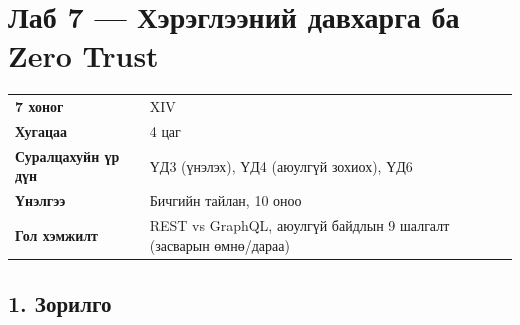 \chapter{Лаб 7 — Хэрэглээний давхарга ба Zero Trust}

\begingroup\scriptsize\begin{longtable}[]{@{}ll@{}}
\toprule
\endhead
\begin{minipage}[t]{0.47\columnwidth}\raggedright
\textbf{7 хоног}\strut
\end{minipage} & \begin{minipage}[t]{0.47\columnwidth}\raggedright
XIV\strut
\end{minipage}\tabularnewline
\begin{minipage}[t]{0.47\columnwidth}\raggedright
\textbf{Хугацаа}\strut
\end{minipage} & \begin{minipage}[t]{0.47\columnwidth}\raggedright
4 цаг\strut
\end{minipage}\tabularnewline
\begin{minipage}[t]{0.47\columnwidth}\raggedright
\textbf{Суралцахуйн үр дүн}\strut
\end{minipage} & \begin{minipage}[t]{0.47\columnwidth}\raggedright
ҮД3 (үнэлэх), ҮД4 (аюулгүй зохиох), ҮД6\strut
\end{minipage}\tabularnewline
\begin{minipage}[t]{0.47\columnwidth}\raggedright
\textbf{Үнэлгээ}\strut
\end{minipage} & \begin{minipage}[t]{0.47\columnwidth}\raggedright
Бичгийн тайлан, 10 оноо\strut
\end{minipage}\tabularnewline
\begin{minipage}[t]{0.47\columnwidth}\raggedright
\textbf{Гол хэмжилт}\strut
\end{minipage} & \begin{minipage}[t]{0.47\columnwidth}\raggedright
REST vs GraphQL, аюулгүй байдлын 9 шалгалт (засварын өмнө/дараа)\strut
\end{minipage}\tabularnewline
\bottomrule
\end{longtable}\endgroup

\hypertarget{ux437ux43eux440ux438ux43bux433ux43e}{%
\section{1. Зорилго}\label{ux437ux43eux440ux438ux43bux433ux43e}}

